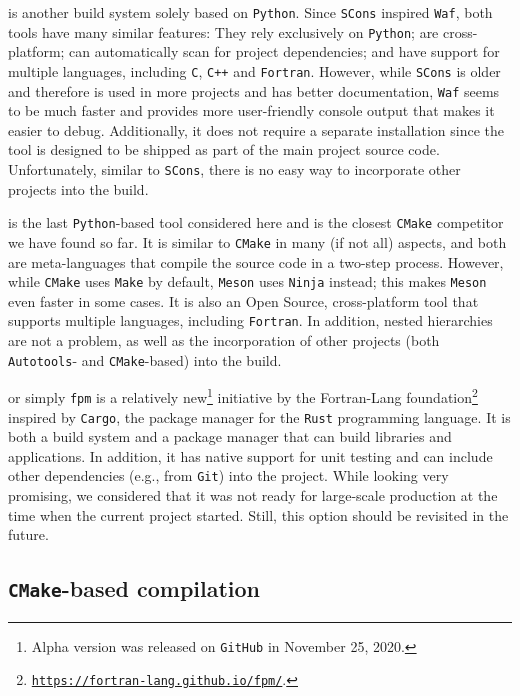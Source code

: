 \documentclass[twocolumn]{aa}
\begin{document}
 is another build system solely based on \texttt{Python}. Since \texttt{SCons} inspired \texttt{Waf}, both tools have many similar features: They rely exclusively on \texttt{Python}; are cross-platform; can automatically scan for project dependencies; and have support for multiple languages, including \texttt{C}, \texttt{C++} and \texttt{Fortran}. However, while \texttt{SCons} is older and therefore is used in more projects and has better documentation, \texttt{Waf} seems to be much faster and provides more user-friendly console output that makes it easier to debug. Additionally, it does not require a separate installation since the tool is designed to be shipped as part of the main project source code. Unfortunately, similar to \texttt{SCons}, there is no easy way to incorporate other projects into the build.

 is the last \texttt{Python}-based tool considered here and is the closest \texttt{CMake} competitor we have found so far. It is similar to \texttt{CMake} in many (if not all) aspects, and both are meta-languages that compile the source code in a two-step process. However, while \texttt{CMake} uses \texttt{Make} by default, \texttt{Meson} uses \texttt{Ninja} instead; this makes \texttt{Meson} even faster in some cases. It is also an Open Source, cross-platform tool that supports multiple languages, including \texttt{Fortran}. In addition, nested hierarchies are not a problem, as well as the incorporation of other projects (both \texttt{Autotools}- and \texttt{CMake}-based) into the build.

 or simply \texttt{fpm} is a relatively new\footnote{ Alpha version was released on \texttt{GitHub} in November 25, 2020.} initiative by the Fortran-Lang foundation\footnote{\href{https://fortran-lang.github.io/fpm/}{\texttt{https://fortran-lang.github.io/fpm/}}.} inspired by \texttt{Cargo}, the package manager for the \texttt{Rust} programming language. It is both a build system and a package manager that can build libraries and applications. In addition, it has native support for unit testing and can include other dependencies (e.g., from \texttt{Git}) into the project. While looking very promising, we considered that it was not ready for large-scale production at the time when the current project started. Still, this option should be revisited in the future.


\subsection{\texttt{CMake}-based compilation}
\label{sec:cmake}
\end{document}
